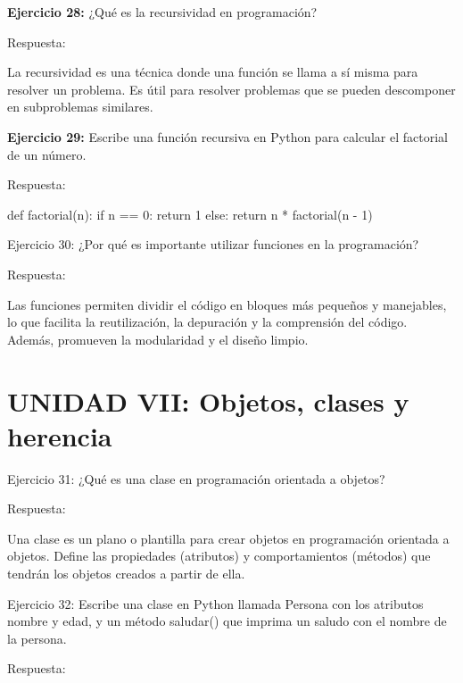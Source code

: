 \documentclass[
  a4paper,
  DIV=11,
  numbers=noendperiod,
  onepage,
  openany]{scrreprt}
\newenvironment{Shaded}{\begin{snugshade}}{\end{snugshade}}
\newcommand{\ControlFlowTok}[1]{\textcolor[rgb]{0.00,0.23,0.31}{#1}}
\newcommand{\DecValTok}[1]{\textcolor[rgb]{0.68,0.00,0.00}{#1}}
\newcommand{\KeywordTok}[1]{\textcolor[rgb]{0.00,0.23,0.31}{#1}}
\newcommand{\NormalTok}[1]{\textcolor[rgb]{0.00,0.23,0.31}{#1}}
\newcommand{\OperatorTok}[1]{\textcolor[rgb]{0.37,0.37,0.37}{#1}}
\begin{document}
\textbf{Ejercicio 28:} ¿Qué es la recursividad en programación?

Respuesta:

La recursividad es una técnica donde una función se llama a sí misma
para resolver un problema. Es útil para resolver problemas que se pueden
descomponer en subproblemas similares.

\textbf{Ejercicio 29:} Escribe una función recursiva en Python para
calcular el factorial de un número.

Respuesta:

\begin{Shaded}
\begin{Highlighting}[]
\KeywordTok{def}\NormalTok{ factorial(n):}
    \ControlFlowTok{if}\NormalTok{ n }\OperatorTok{==} \DecValTok{0}\NormalTok{:}
        \ControlFlowTok{return} \DecValTok{1}
    \ControlFlowTok{else}\NormalTok{:}
        \ControlFlowTok{return}\NormalTok{ n }\OperatorTok{*}\NormalTok{ factorial(n }\OperatorTok{{-}} \DecValTok{1}\NormalTok{)}
\end{Highlighting}
\end{Shaded}

Ejercicio 30: ¿Por qué es importante utilizar funciones en la
programación?

Respuesta:

Las funciones permiten dividir el código en bloques más pequeños y
manejables, lo que facilita la reutilización, la depuración y la
comprensión del código. Además, promueven la modularidad y el diseño
limpio.

\hypertarget{unidad-vii-objetos-clases-y-herencia}{%
\section{UNIDAD VII: Objetos, clases y
herencia}\label{unidad-vii-objetos-clases-y-herencia}}

Ejercicio 31: ¿Qué es una clase en programación orientada a objetos?

Respuesta:

Una clase es un plano o plantilla para crear objetos en programación
orientada a objetos. Define las propiedades (atributos) y
comportamientos (métodos) que tendrán los objetos creados a partir de
ella.

Ejercicio 32: Escribe una clase en Python llamada Persona con los
atributos nombre y edad, y un método saludar() que imprima un saludo con
el nombre de la persona.

Respuesta:
\end{document}
